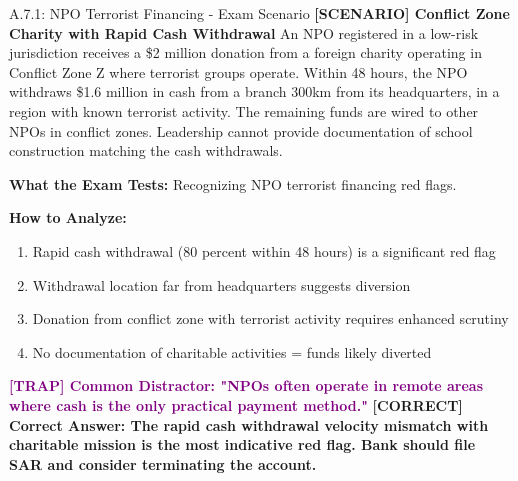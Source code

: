 \documentclass[11pt,a4paper]{beamer}
\newcommand{\trap}[1]{\textcolor{purple}{\textbf{[TRAP] #1}}}
\newcommand{\correct}[1]{\textcolor{green!50!black}{\textbf{[CORRECT] #1}}}
\newcommand{\scenario}[1]{\textcolor{blue!70!black}{\textbf{[SCENARIO] #1}}}
\begin{document}
	\begin{frame}{A.7.1: NPO Terrorist Financing - Exam Scenario}
		\scenario{Conflict Zone Charity with Rapid Cash Withdrawal}
		An NPO registered in a low-risk jurisdiction receives a \$2 million donation from a foreign charity operating in Conflict Zone Z where terrorist groups operate. Within 48 hours, the NPO withdraws \$1.6 million in cash from a branch 300km from its headquarters, in a region with known terrorist activity. The remaining funds are wired to other NPOs in conflict zones. Leadership cannot provide documentation of school construction matching the cash withdrawals.
		
		\vspace{0.1cm}
		\textbf{What the Exam Tests:} Recognizing NPO terrorist financing red flags.
		
		\vspace{0.1cm}
		\textbf{How to Analyze:}
		\begin{enumerate}
			\item Rapid cash withdrawal (80 percent within 48 hours) is a significant red flag
			\item Withdrawal location far from headquarters suggests diversion
			\item Donation from conflict zone with terrorist activity requires enhanced scrutiny
			\item No documentation of charitable activities = funds likely diverted
		\end{enumerate}
		
		\trap{Common Distractor: "NPOs often operate in remote areas where cash is the only practical payment method."}
		\correct{Correct Answer: The rapid cash withdrawal velocity mismatch with charitable mission is the most indicative red flag. Bank should file SAR and consider terminating the account.}
	\end{frame}
	
	
\end{document}
